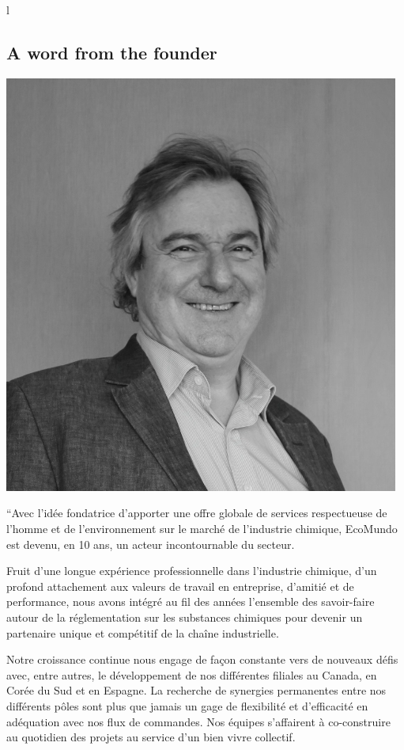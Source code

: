 l\documentclass[a4paper,12pt,twoside]{report}
\begin{document}
\subsection{A word from the founder}
\includegraphics[scale=0.5]{images/pierre}

“Avec l’idée fondatrice d’apporter une offre globale de services respectueuse de l’homme et de l’environnement sur le marché de l’industrie chimique, EcoMundo est devenu, en 10 ans, un acteur incontournable du secteur. 

Fruit d’une longue expérience professionnelle dans l’industrie chimique, d’un profond attachement aux valeurs de travail en entreprise, d’amitié et de performance, nous avons intégré au fil des années l’ensemble des savoir-faire autour de la réglementation sur les substances chimiques pour devenir un partenaire unique et compétitif de la chaîne industrielle.

Notre croissance continue nous engage de façon constante vers de nouveaux défis avec, entre autres, le développement de nos différentes filiales au Canada, en Corée du Sud et en Espagne. La recherche de synergies permanentes entre nos différents pôles sont plus que jamais un gage de flexibilité et d’efficacité en adéquation avec nos flux de commandes. Nos équipes s’affairent à co-construire au quotidien des projets au service d’un bien vivre collectif.
\end{document}
